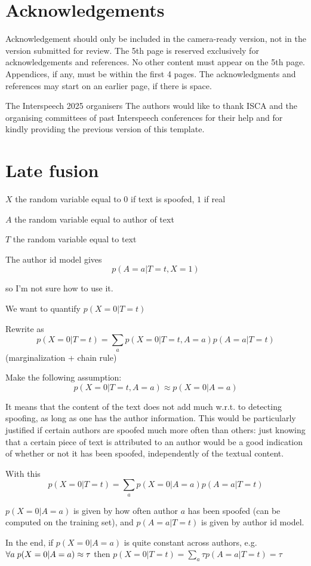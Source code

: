 \documentclass{Interspeech}
\begin{document}
\ifinterspeechfinal
  \section{Acknowledgements}
  Acknowledgement should only be included in the camera-ready version, not in the
  version submitted for review. The 5th page is reserved exclusively for
  acknowledgements and references. No other content must appear on the 5th page.
  Appendices, if any, must be within the first 4 pages. The acknowledgments and
  references may start on an earlier page, if there is space.

  \ifinterspeechfinal
    The Interspeech 2025 organisers
  \else
    The authors
  \fi
  would like to thank ISCA and the organising committees of past Interspeech conferences for their help and for kindly providing the previous version of this template.
\fi




\section{Late fusion}
\label{sec:late-fusion}

$X$ the random variable equal to $0$ if text is spoofed, $1$ if real

$A$ the random variable equal to author of text

$T$ the random variable equal to text

The author id model gives $$p(A=a|T=t,X=1)$$

so I'm not sure how to use it.

We want to quantify $p(X=0|T=t)$

Rewrite as $${p(X=0|T=t) = \sum_a p(X=0|T=t,A=a)p(A=a|T=t)}$$ (marginalization
+ chain rule)

Make the following assumption: $$p(X=0|T=t,A=a) \approx p(X=0|A=a)$$

It means that the content of the text does not add much w.r.t. to detecting spoofing, as
long as one has the author information. This would be particularly justified if
certain authors are spoofed much more often than others: just knowing that a
certain piece of text is attributed to an author would be a good indication of
whether or not it has been spoofed, independently of the textual content.

With this $${p(X=0|T=t) = \sum_a p(X=0|A=a)p(A=a|T=t)}$$

${p(X=0|A=a)}$ is given by how often author $a$ has been spoofed (can be computed on the training set), and ${p(A=a|T=t)}$ is given by author id model.

In the end, if $p(X=0|A=a)$ is quite constant across authors, e.g. ${\forall a
      \thickspace p(X=0|A=a) \approx \tau}$ then ${p(X=0|T=t) = \sum_a \tau
      p(A=a|T=t) = \tau}$
\end{document}

